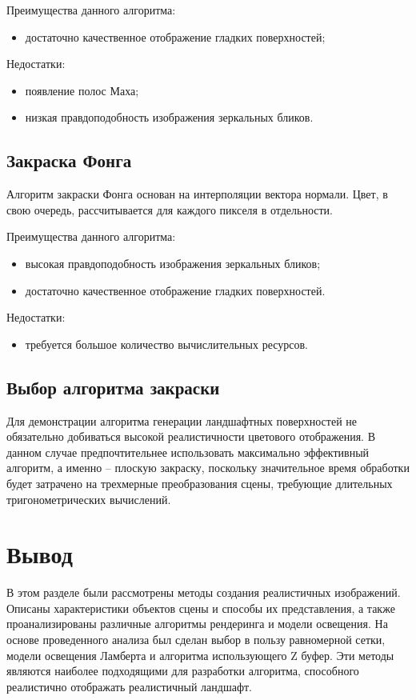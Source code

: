 Преимущества данного алгоритма:

\begin{itemize}
	\item достаточно качественное отображение гладких поверхностей;
\end{itemize}

Недостатки:

\begin{itemize}
	\item появление полос Маха;
	\item низкая правдоподобность изображения зеркальных бликов.
\end{itemize}

\subsection{Закраска Фонга}

 Алгоритм закраски Фонга основан на интерполяции вектора нормали.  Цвет, в свою очередь, рассчитывается для каждого пикселя в отдельности.  
 
 Преимущества данного алгоритма:
 
 \begin{itemize}
 	\item высокая правдоподобность изображения зеркальных бликов;
 	\item достаточно качественное отображение гладких поверхностей.
 \end{itemize}
 
 Недостатки:
 
 \begin{itemize}
 	\item требуется большое количество вычислительных ресурсов.
 \end{itemize}


\subsection*{Выбор алгоритма закраски}

Для демонстрации алгоритма генерации ландшафтных поверхностей не обязательно добиваться высокой реалистичности цветового отображения. В данном случае предпочтительнее использовать максимально эффективный алгоритм, а именно – плоскую закраску, поскольку значительное время обработки будет затрачено на трехмерные преобразования сцены, требующие длительных тригонометрических вычислений.

\section*{Вывод}

В этом разделе были рассмотрены методы создания реалистичных изображений. Описаны характеристики объектов сцены и способы их представления, а также проанализированы различные алгоритмы рендеринга и модели освещения. На основе проведенного анализа был сделан выбор в пользу равномерной сетки, модели освещения Ламберта и алгоритма использующего Z буфер. Эти методы являются наиболее подходящими для разработки алгоритма, способного реалистично отображать реалистичный ландшафт.

